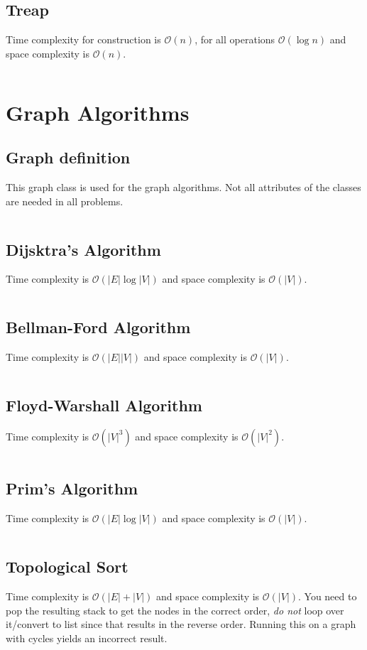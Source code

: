 \documentclass[8pt,a4paper,landscape,oneside]{amsart}
\newcommand{\code}[1]{\inputminted[fontsize=\normalsize,baselinestretch=1]{java}{code/#1}}
\newcommand{\bigO}{\mathcal{O}}
\begin{document}
\begin{multicols*}{3}
  \subsection{Treap}
  Time complexity for construction is $\bigO(n)$, for all operations $\bigO(\log{n})$ and space complexity is $\bigO(n)$.
  \code{Structures/Treap.java}
  
  
\section{Graph Algorithms}
  \subsection{Graph definition}
  This graph class is used for the graph algorithms. Not all attributes of the classes are needed in all problems.
  \code{Graphs/Graph.java}
  
  \subsection{Dijsktra's Algorithm}
  Time complexity is $\bigO(|E| \log{|V|})$ and space complexity is $\bigO(|V|)$.
  \code{Graphs/Dijkstras.java}
  
  \subsection{Bellman-Ford Algorithm}
  Time complexity is $\bigO(|E||V|)$ and space complexity is $\bigO(|V|)$.
  \code{Graphs/BellmanFord.java}
  
  \subsection{Floyd-Warshall Algorithm}
  Time complexity is $\bigO(|V|^3)$ and space complexity is $\bigO(|V|^2)$.
  \code{Graphs/FloydWarshall.java}
  
  \subsection{Prim's Algorithm}
  Time complexity is $\bigO(|E| \log{|V|})$ and space complexity is $\bigO(|V|)$.
  \code{Graphs/MST.java}
  
  \subsection{Topological Sort}
  Time complexity is $\bigO(|E| + |V|)$ and space complexity is $\bigO(|V|)$. You need to pop the resulting stack to get the nodes in the correct order, \textit{do not} loop over it/convert to list since that results in the reverse order. Running this on a graph with cycles yields an incorrect result.
  \code{Graphs/TopologicalSort.java}
  

\end{multicols*}
\end{document}
